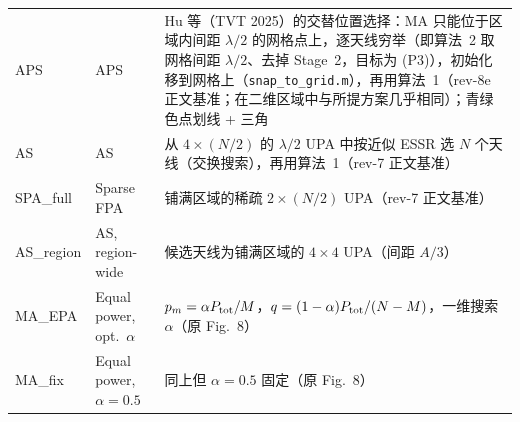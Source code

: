 \documentclass[11pt,a4paper]{ctexart}
\newcommand{\code}[1]{\texttt{#1}}
\newcommand{\Ptot}{P_{\rm tot}}
\begin{document}
\begin{longtable}{>{\ttfamily}p{2.1cm}p{3.7cm}p{9.5cm}}
APS & APS & Hu 等（TVT 2025）的交替位置选择：MA 只能位于区域内间距 $\lambda/2$ 的网格点上，逐天线穷举（即算法~2 取网格间距 $\lambda/2$、去掉 Stage~2，目标为 (P3)），初始化移到网格上（\code{snap\_to\_grid.m}），再用算法~1（rev-8e 正文基准；在二维区域中与所提方案几乎相同）；青绿色点划线 + 三角 \\
AS & AS & 从 $4\times(N/2)$ 的 $\lambda/2$ UPA 中按近似 ESSR 选 $N$ 个天线（交换搜索），再用算法~1（rev-7 正文基准）\\
SPA\_full & Sparse FPA & 铺满区域的稀疏 $2\times(N/2)$ UPA（rev-7 正文基准）\\
AS\_region & AS, region-wide & 候选天线为铺满区域的 $4\times4$ UPA（间距 $A/3$）\\
MA\_EPA & Equal power, opt.\ $\alpha$ & $p_m=\alpha\Ptot/M$，$q=(1-\alpha)\Ptot/(N-M)$，一维搜索 $\alpha$（原 Fig.~8）\\
MA\_fix & Equal power, $\alpha=0.5$ & 同上但 $\alpha=0.5$ 固定（原 Fig.~8）\\
\bottomrule
\end{longtable}

\end{document}
